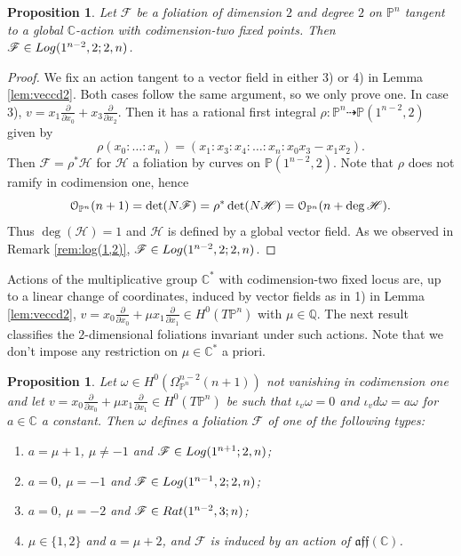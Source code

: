 \documentclass[twoside]{amsart}
\numberwithin{equation}{section}
\newcommand{\opn}{{\mathcal O}_{\mathbb{P}^{n}}}
\newcommand{\pn}{{\mathbb{P}^{n}}}
\newcommand{\tpn}{T{\mathbb{P}^{n}}}
\newcommand{\mf}[1]{\mathfrak{#1}}
\def\PP{{\mathbb{P}}}
\def\CC{{\mathbb{C}}}
\newcommand{\QQ}{\mathbb{Q}}
\newcommand{\sF}{\mathscr{F}}
\newcommand{\sH}{\mathscr{H}}
\newcommand{\nF}{{\rm N}\sF}
\newcommand{\nH}{{\rm N}\sH}
\newcommand{\del}[1]{\frac{\partial}{\partial #1}}
\newcommand{\rat}[2]{{\rm Rat}(#1;#2)}
\newcommand{\logg}[3]{{\rm Log}(#1;#2,#3)}
\newtheorem{proposition}[theorem]{Proposition}
\theoremstyle{definition}
\begin{document}
\begin{proposition}\label{prop:class-om-nilp}
Let $\sF$ be a foliation of dimension $2$ and degree $2$ on $\pn$ tangent to a global $\CC$-action with codimension-two fixed points. Then $\sF \in \logg{1^{n-2},2}{2}{n}$.
\end{proposition}


\begin{proof}
We fix an action tangent to a vector field in either 3) or 4) in Lemma \ref{lem:veccd2}. Both cases follow the same argument, so we only prove one. In case 3), $v = x_1\del{ x_0} + x_3\del{ x_2}$. Then it has a rational first integral $\rho\colon \pn \dashrightarrow \PP(1^{n-2},2)$ given by 
\[
\rho(x_0: \dots : x_n) = (x_1:x_3:x_4:\dots :x_n: x_0x_3-x_1x_2).
\]
Then $\sF = \rho^*\sH$ for $\sH$ a foliation by curves on $\PP(1^{n-2},2)$. Note that $\rho$ does not ramify in codimension one, hence 
\[
\opn(n+1) = \det(\nF) = \rho^*\det(\nH) = \opn(n+\deg \sH).
\]
Thus $\deg(\sH) = 1$ and $\sH$ is defined by a global vector field. As we observed in Remark \ref{rem:log(1,2)}, $\sF \in \logg{1^{n-2},2}{2}{n}$. 
\end{proof}


Actions of the multiplicative group $\CC^\ast$ with codimension-two fixed locus are,  up to a linear change of coordinates, induced by vector fields as in 1) in Lemma \ref{lem:veccd2}, $v = x_0\del{ x_0} + \mu x_1\del{ x_1}\in H^0(\tpn)$ with $\mu \in \QQ$. The next result classifies the $2$-dimensional foliations invariant under such actions. Note that we don't impose any restriction on $\mu\in \CC^*$ a priori. 

\begin{proposition}\label{prop:class-om-diag}
 Let $\omega\in H^0(\Omega_{\pn}^{n-2}(n+1))$ not vanishing in codimension one and let $v = x_0\del{ x_0} + \mu x_1\del{ x_1}\in H^0(\tpn)$ be such that $\iota_v \omega = 0$ and $\iota_vd\omega = a \omega$ for $a\in\CC$ a constant. Then $\omega$ defines a foliation $\sF$ of one of the following types:
 \begin{enumerate}
 \item $a = \mu + 1$, $\mu \neq -1$ and $\sF \in \logg{1^{n+1}}{2}{n}$;
 \item $a = 0$, $\mu = -1$ and $\sF\in \logg{1^{n-1},2}{2}{n}$;
 \item $a = 0$, $\mu = -2$ and $\sF \in \rat{1^{n-2},3}{n}$;
 \item $\mu \in \{1,2\}$ and $a = \mu + 2$, and $\sF$ is induced by an action of $\mf{aff}(\CC)$.
\end{enumerate}
\end{proposition}
\end{document}
